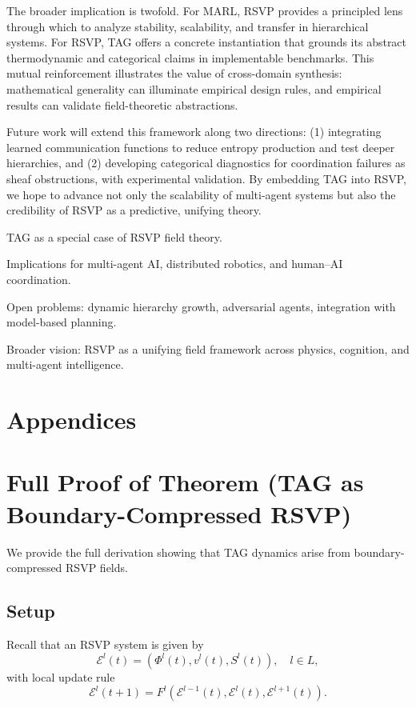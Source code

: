 \documentclass[11pt,a4paper]{article}
\begin{document}
The broader implication is twofold. For MARL, RSVP provides a principled lens
through which to analyze stability, scalability, and transfer in hierarchical
systems. For RSVP, TAG offers a concrete instantiation that grounds its abstract
thermodynamic and categorical claims in implementable benchmarks. This mutual
reinforcement illustrates the value of cross-domain synthesis: mathematical
generality can illuminate empirical design rules, and empirical results can
validate field-theoretic abstractions.

Future work will extend this framework along two directions: (1) integrating
learned communication functions to reduce entropy production and test deeper
hierarchies, and (2) developing categorical diagnostics for coordination
failures as sheaf obstructions, with experimental validation. By embedding TAG
into RSVP, we hope to advance not only the scalability of multi-agent systems
but also the credibility of RSVP as a predictive, unifying theory.

TAG as a special case of RSVP field theory.

Implications for multi-agent AI, distributed robotics, and human–AI coordination.

Open problems: dynamic hierarchy growth, adversarial agents, integration with model-based planning.

Broader vision: RSVP as a unifying field framework across physics, cognition, and multi-agent intelligence.

\section{Appendices}

\appendix

\section{Full Proof of Theorem (TAG as Boundary-Compressed RSVP)}
\label{app:proof}
We provide the full derivation showing that TAG dynamics arise from boundary-compressed RSVP fields.

\subsection{Setup}
Recall that an RSVP system is given by
\[
\mathcal{E}^l(t) = (\Phi^l(t), v^l(t), S^l(t)), \quad l \in L,
\]
with local update rule
\[
\mathcal{E}^l(t+1) = F^l(\mathcal{E}^{l-1}(t),\mathcal{E}^l(t),\mathcal{E}^{l+1}(t)).
\]
\end{document}
